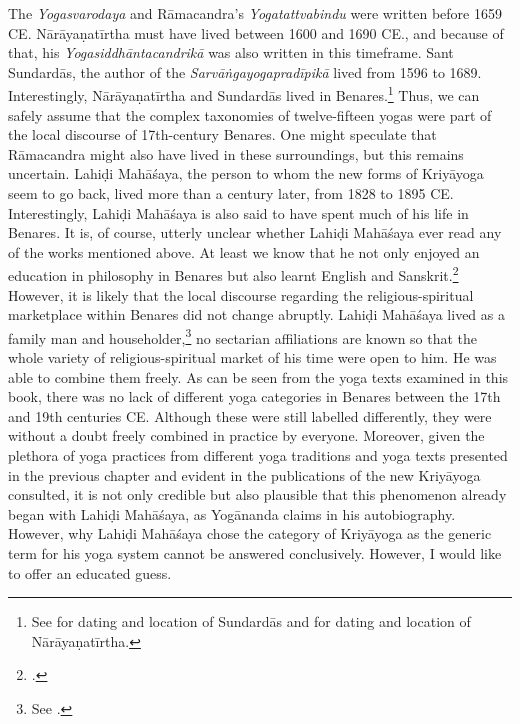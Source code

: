 The \textit{Yogasvarodaya} and Rāmacandra's \textit{Yogatattvabindu} were written before 1659 CE. Nārāyaṇatīrtha must have lived between 1600 and 1690 CE., and because of that, his \textit{Yogasiddhāntacandrikā} was also written in this timeframe. Sant Sundardās, the author of the \textit{Sarvāṅgayogapradīpikā} lived from 1596 to 1689. Interestingly, Nārāyaṇatīrtha and Sundardās lived in Benares.\footnote{See \citeauthor[2014: 684]{burger2014sarvangayogapradipika} for dating and location of Sundardās and \citeauthor[2004: 24]{penna2004} for dating and location of Nārāyaṇatīrtha.} Thus, we can safely assume that the complex taxonomies of twelve-fifteen yogas were part of the local discourse of 17th-century Benares. One might speculate that Rāmacandra might also have lived in these surroundings, but this remains uncertain. Lahiḍi Mahāśaya, the person to whom the new forms of Kriyāyoga seem to go back, lived more than a century later, from 1828 to 1895 CE. Interestingly, Lahiḍi Mahāśaya is also said to have spent much of his life in Benares. It is, of course, utterly unclear whether Lahiḍi Mahāśaya ever read any of the works mentioned above. At least we know that he not only enjoyed an education in philosophy in Benares but also learnt English and Sanskrit.\footnote{\citeauthor[2008: 255-256]{jones2008encyclopedia}.} However, it is likely that the local discourse regarding the religious-spiritual marketplace within Benares did not change abruptly. Lahiḍi Mahāśaya lived as a family man and householder,\footnote{See \citeauthor[1946: ch. 34,35]{autobioyogi}.} no sectarian affiliations are known so that the whole variety of religious-spiritual market of his time were open to him. He was able to combine them freely. As can be seen from the yoga texts examined in this book, there was no lack of different yoga categories in Benares between the 17th and 19th centuries CE. Although these were still labelled differently, they were without a doubt freely combined in practice by everyone. Moreover, given the plethora of yoga practices from different yoga traditions and yoga texts presented in the previous chapter and evident in the publications of the new Kriyāyoga consulted, it is not only credible but also plausible that this phenomenon already began with Lahiḍi Mahāśaya, as Yogānanda claims in his autobiography. However, why Lahiḍi Mahāśaya chose the category of Kriyāyoga as the generic term for his yoga system cannot be answered conclusively. However, I would like to offer an educated guess.


